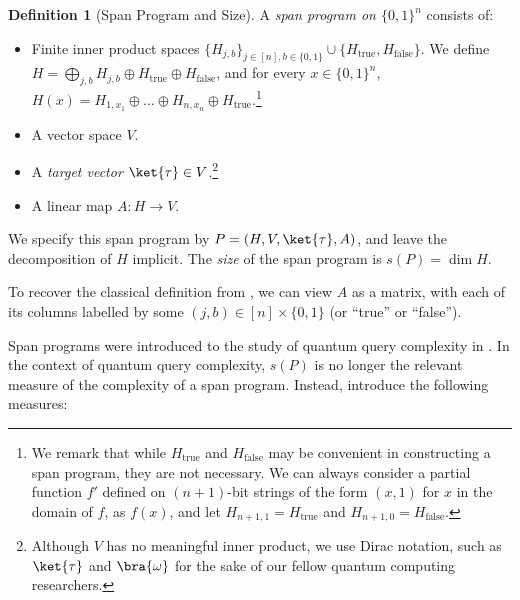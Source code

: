 \documentclass[11pt]{article}
\numberwithin{equation}{section}
\theoremstyle{definition}
\newtheorem{definition}[theorem]{Definition}
\theoremstyle{plain}
\begin{document}
\begin{definition}[Span Program and Size]\label{def:span}
A \emph{span program on $\{0,1\}^n$} consists of:
\begin{itemize}
\item Finite inner product spaces $\{H_{j,b}\}_{j\in [n],b\in\{0,1\}}\cup\{H_{\mathrm{true}},H_{\mathrm{false}}\}$. We define $H=\bigoplus_{j,b}H_{j,b}\oplus H_{\mathrm{true}}\oplus H_{\mathrm{false}}$, and for every $x\in\{0,1\}^n$, $H(x)=H_{1,x_1}\oplus\dots\oplus H_{n,x_n}\oplus H_\mathrm{true}$.\footnote{We remark that while $H_{\mathrm{true}}$ and $H_{\mathrm{false}}$ may be convenient in constructing a span program, they are not necessary. We can always consider a partial function $f'$ defined on $(n+1)$-bit strings of the form $(x,1)$ for $x$ in the domain of $f$, as $f(x)$, and let $H_{n+1,1}=H_{\mathrm{true}}$ and $H_{n+1,0}=H_{\mathrm{false}}$.} 
\item A vector space $V$.
\item A \emph{target vector} $\ket{\tau}\in V$.\footnote{Although $V$ has no meaningful inner product, we use Dirac notation, such as $\ket{\tau}$ and $\bra{\omega}$ for the sake of our fellow quantum computing researchers.}
\item A linear map $A:H\rightarrow V$.
\end{itemize}
We specify this span program by $P=(H,V,\ket{\tau},A)$, and leave the decomposition of $H$ implicit. The \emph{size} of the span program is $s(P)=\dim H$. 
\end{definition}

To recover the classical definition from \cite{KW93}, we can view $A$ as a matrix, with each of its columns labelled by some $(j,b)\in [n]\times \{0,1\}$ (or ``true'' or ``false''). 


Span programs were introduced to the study of quantum query complexity in \cite{RS12}. In the context of quantum query complexity, $s(P)$ is no longer the relevant measure of the complexity of a span program. Instead, \cite{RS12} introduce the following measures:
\end{document}
